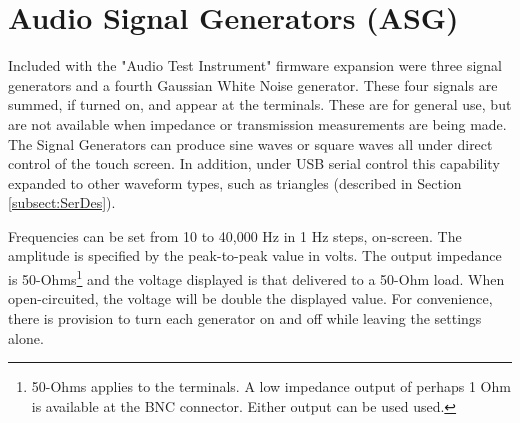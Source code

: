 \section{Audio Signal Generators (ASG)}
\label{sect:ASG}
Included with the "Audio Test Instrument" firmware expansion were three signal generators and a fourth Gaussian White Noise generator. These four signals are summed, if turned on, and appear at the  terminals.  These are for general use, but are not available when impedance or transmission measurements are being made.  The Signal Generators can produce sine waves or square waves all under direct control of the touch screen.  In addition, under USB serial control this capability  expanded to other waveform types, such as triangles (described in Section \ref{subsect:SerDes}).

Frequencies can be set from 10 to 40,000 Hz in 1 Hz steps, on-screen.  The amplitude is specified by the peak-to-peak value in volts.  The output impedance is 50-Ohms\footnote{50-Ohms applies to the  terminals.  A low impedance output of perhaps 1 Ohm is available at the BNC connector.  Either output can be used used.}
%
 and the voltage displayed is that delivered to a 50-Ohm load. When open-circuited, the voltage will be double the displayed value.  For convenience, there is provision to turn each generator on and off while leaving the settings alone.


